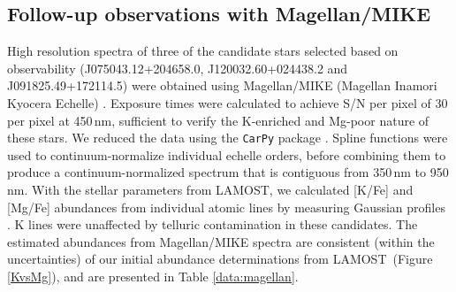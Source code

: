 \documentclass[a4paper,fleqn,usenatbib]{mnras}
\newcommand{\todo}[1]{\textcolor{red}{#1}}
\newcommand{\project}[1]{#1}
\newcommand{\lamost}{\project{LAMOST}}
\begin{document}


\subsection{Follow-up observations with Magellan/MIKE}
High resolution spectra of three of the candidate stars selected based on observability (J075043.12+204658.0, J120032.60+024438.2 and J091825.49+172114.5) were obtained using Magellan/MIKE (Magellan Inamori Kyocera Echelle) \citep{shectman2003magellan,bernstein2003mike}. Exposure times were calculated to achieve S/N per pixel of 30 per pixel at 450\,nm, sufficient to verify the K-enriched and Mg-poor nature of these stars. We reduced the data using the \texttt{CarPy} package \citep{kelson2003}. Spline functions were used to continuum-normalize individual echelle orders, before combining them to produce a continuum-normalized spectrum that is contiguous from 350\,nm to 950\,nm. With the stellar parameters from \lamost, we calculated [K/Fe] and [Mg/Fe] abundances from individual atomic lines by measuring Gaussian profiles \citep{castelli2004,sneden,casey2014}. K lines were unaffected by telluric contamination in these candidates. The estimated abundances from Magellan/MIKE spectra are consistent (within the uncertainties) of our initial abundance determinations from \lamost\ (Figure \ref{KvsMg}), and are presented in Table \ref{data:magellan}.
\end{document}
